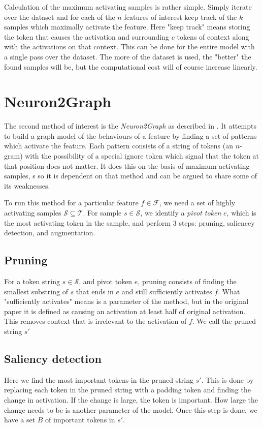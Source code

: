 Calculation of the maximum activating samples is rather simple.
Simply iterate over the dataset 
and for each of the $n$ features of interest 
keep track of the $k$ samples which maximally activate the feature.
Here "keep track" means storing the token that causes the activation and 
surrounding $c$ tokens of context along with the activations on that context.
This can be done for the entire model with a single pass over the dataset.
The more of the dataset is used, the "better" the found samples will be, 
but the computational cost will of course increase linearly.

\section{Neuron2Graph}
The second method of interest is the \emph{Neuron2Graph} 
as described in \cite{foote_neuron_2023}.
It attempts to build a graph model of the behaviours of a feature 
by finding a set of patterns which activate the feature.
Each pattern consists of a string of tokens (an $n$-gram) 
with the possibility of a special ignore token 
which signal that the token at that position does not matter.
It does this on the basis of maximum activating samples,
s 
so it is dependent on that method and 
can be argued to share some of its weaknesses.

To run this method for a particular feature $f\in\mathcal{F}$, 
we need a set of highly activating samples $\mathcal S\subseteq \mathcal T$.
For sample $s\in\mathcal S$, we identify a \emph{pivot token} $e$, 
which is the most activating token in the sample, 
and perform 3 steps: pruning, saliencey detection, and augmentation.

\subsection{Pruning}
For a token string $s\in\mathcal S$, and pivot token $e$, 
pruning consists of finding the smallest substring of $s$ that ends in $e$ 
and still sufficiently activates $f$.
What "sufficiently activates" means is a parameter of the method, 
but in the original paper it is defined as causing an activation at least
half of original activation.
This removes context that is irrelevant to the activation of $f$.
We call the pruned string $s'$

\subsection{Saliency detection}
Here we find the most important tokens in the pruned string $s'$.
This is done by replacing each token in the pruned string 
with a padding token and finding the change in activation.
If the change is large, the token is important.
How large the change needs to be is another parameter of the model.
Once this step is done, we have a set $B$ of important tokens in $s'$.

